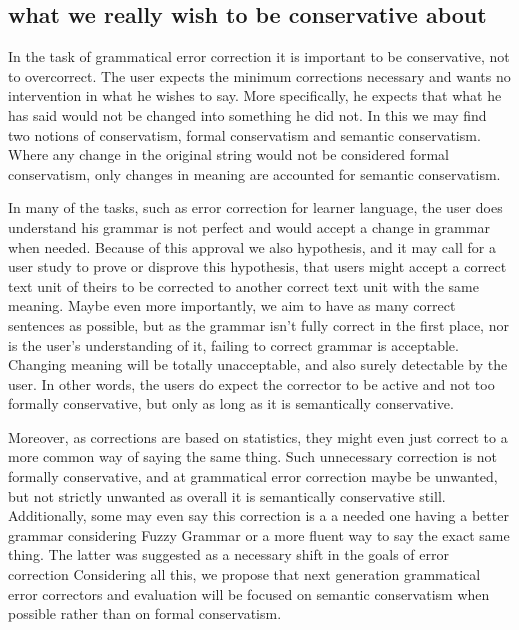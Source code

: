\documentclass[english]{article}
\begin{document}
\subsection{what we really wish to be conservative about}

In the task of grammatical error correction it is important to be
conservative, not to overcorrect. The user expects the minimum corrections
necessary and wants no intervention in what he wishes to say. More
specifically, he expects that what he has said would not be changed
into something he did not. In this we may find two notions of conservatism,
formal conservatism and semantic conservatism. Where any change in
the original string would not be considered formal conservatism, only
changes in meaning are accounted for semantic conservatism. 

In many of the tasks, such as error correction for learner language,
the user does understand his grammar is not perfect and would accept
a change in grammar when needed. Because of this approval we also
hypothesis, and it may call for a user study to prove or disprove
this hypothesis, that users might accept a correct text unit of theirs
to be corrected to another correct text unit with the same meaning.
Maybe even more importantly, we aim to have as many correct sentences
as possible, but as the grammar isn't fully correct in the first place,
nor is the user's understanding of it, failing to correct grammar
is acceptable. Changing meaning will be totally unacceptable, and
also surely detectable by the user. In other words, the users do expect
the corrector to be active and not too formally conservative, but
only as long as it is semantically conservative. 

Moreover, as corrections are based on statistics, they might even
just correct to a more common way of saying the same thing. Such unnecessary
correction is not formally conservative, and at grammatical error
correction maybe be unwanted, but not strictly unwanted as overall
it is semantically conservative still. Additionally, some may even
say this correction is a a needed one having a better grammar considering
Fuzzy Grammar\cite{lakoff1973fuzzy,madnani2011they} or a more fluent
way to say the exact same thing. The latter was suggested as a necessary
shift in the goals of error correction\cite{sakaguchi2016reassessing}
Considering all this, we propose that next generation grammatical
error correctors and evaluation will be focused on semantic conservatism
when possible rather than on formal conservatism.
\end{document}
